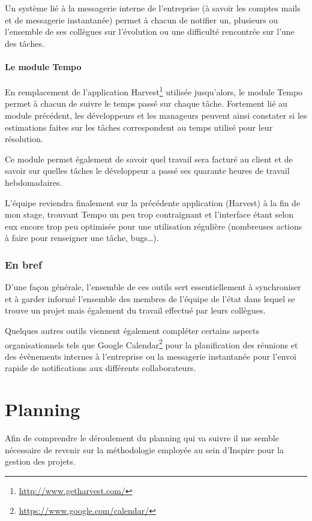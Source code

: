 \documentclass[12pt,a4paper]{book}
\begin{document}
Un système lié à la messagerie interne de l'entreprise (à savoir les comptes mails et de messagerie instantanée) permet à chacun de notifier un, plusieurs ou l'ensemble de ses collègues sur l'évolution ou une difficulté rencontrée sur l'une des tâches.

\subsubsection{Le module Tempo}

En remplacement de l'application Harvest\footnote{\url{http://www.getharvest.com/}} utilisée jusqu'alors, le module Tempo permet à chacun de suivre le temps passé sur chaque tâche. Fortement lié au module précédent, les développeurs et les manageurs peuvent ainsi constater si les estimations faites sur les tâches correspondent au temps utilisé pour leur résolution.

Ce module permet également de savoir quel travail sera facturé au client et de savoir sur quelles tâches le développeur a passé ses quarante heures de travail hebdomadaires.

L'équipe reviendra finalement sur la précédente application (Harvest) à la fin de mon stage, trouvant Tempo un peu trop contraignant et l'interface étant selon eux encore trop peu optimisée pour une utilisation régulière (nombreuses actions à faire pour renseigner une tâche, bugs…).

\subsection{En bref} 

D'une façon générale, l'ensemble de ces outils sert essentiellement à synchroniser et à garder informé l'ensemble des membres de l'équipe de l'état dans lequel se trouve un projet mais également du travail effectué par leurs collègues.

Quelques autres outils viennent également compléter certains aspects organisationnels tels que Google Calendar\footnote{\url{https://www.google.com/calendar/}} pour la planification des réunions et des évènements internes à l'entreprise ou la messagerie instantanée pour l'envoi rapide de notifications aux différents collaborateurs.

\chapter{Planning}

Afin de comprendre le déroulement du planning qui va suivre il me semble nécessaire de revenir sur la méthodologie employée au sein d'Inspire pour la gestion des projets.
\end{document}
